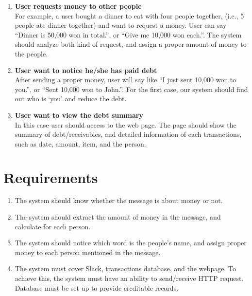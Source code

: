 \documentclass[11pt]{article}
\begin{document}
\begin{enumerate}
  \item \textbf{User requests money to other people} \\
  For example, a user bought a dinner to eat with four people together,
  (i.e., 5 people ate dinner together)
  and want to request a money.
  User can say ``Dinner is 50,000 won in total.'',
  or ``Give me 10,000 won each.''.
  The system should analyze both kind of request,
  and assign a proper amount of money to the people.

  \item \textbf{User want to notice he/she has paid debt} \\
  After sending a proper money, user will say like
  ``I just sent 10,000 won to you.'', or ``Sent 10,000 won to John.''.
  For the first case, our system should find out who is `you'
  and reduce the debt.

  \item \textbf{User want to view the debt summary} \\
  In this case user should access to the web page.
  The page should show the summary of debt/receivables,
  and detailed information of each transactions,
  such as date, amount, item, and the person.
\end{enumerate}

\section{Requirements}
\begin{enumerate}
  \item The system should know whether the message is about money or not. 
  \item The system should extract the amount of money in the message,
  and calculate for each person.
  \item The system should notice which word is the people's name,
  and assign proper money to each person mentioned in the message.
  \item The system must cover Slack, transactions database, and the webpage.
  To achieve this, the system must have an ability to send/receive HTTP request.
  Database must be set up to provide creditable records.
\end{enumerate}
\end{document}
